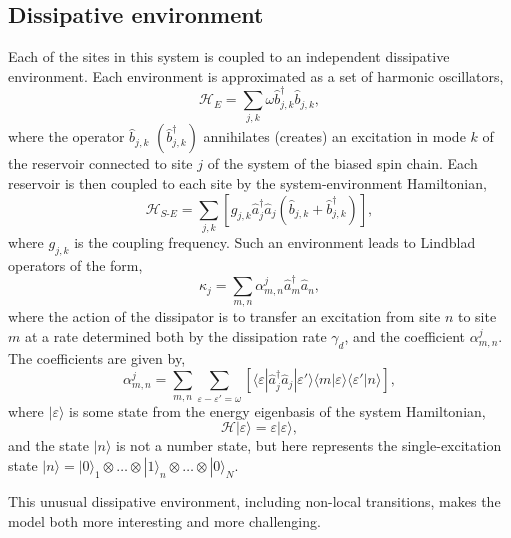 \subsection{Dissipative environment}
Each of the sites in this system is coupled to an independent dissipative environment. Each environment is approximated as a set of harmonic oscillators,
\begin{equation}
	\mathcal{H}_{E} = \sum_{j,k} \omega\hat{b}_{j,k}^{\dagger}\hat{b}_{j,k},
	\label{eq:fw1-3}
\end{equation}
where the operator \(\hat{b}_{j,k}\) \((\hat{b}_{j,k}^{\dagger})\) annihilates (creates) an excitation in mode \(k\) of the reservoir connected to site \(j\) of the system of the biased spin chain. Each reservoir is then coupled to each site by the system-environment Hamiltonian,
\begin{equation}
	\mathcal{H}_{S\text{-}E} = \sum_{j,k} \left[ g_{j,k}\hat{a}_{j}^{\dagger}\hat{a}_{j}\left( \hat{b}_{j,k} + \hat{b}_{j,k}^{\dagger} \right)\right],
	\label{eq:fw1-4}
\end{equation}
where \(g_{j,k}\) is the coupling frequency. Such an environment leads to Lindblad operators of the form,
\begin{equation}
	\kappa_{j} = \sum_{m,n} \alpha_{m,n}^{j} \hat{a}_{m}^{\dagger}\hat{a}_{n},
	\label{eq:fw1-5}
\end{equation}
where the action of the dissipator is to transfer an excitation from site \(n\) to site \(m\) at a rate determined both by the dissipation rate \(\gamma_{d}\), and the coefficient \(\alpha_{m,n}^{j}\). The coefficients are given by,
\begin{equation}
	\alpha_{m,n}^{j} = \sum_{m,n} \sum_{\varepsilon - \varepsilon' = \omega} \left[ \langle \varepsilon | \hat{a}_{j}^{\dagger}\hat{a}_{j} | \varepsilon' \rangle \langle m |\varepsilon \rangle \langle \varepsilon' | n \rangle \right], 
	\label{eq:fw1-6}
\end{equation}
where \(|\varepsilon \rangle\) is some state from the energy eigenbasis of the system Hamiltonian,
\begin{equation}
	\mathcal{H}|\varepsilon \rangle = \varepsilon|\varepsilon\rangle,
	\label{eq:fw1-7}
\end{equation}
and the state \(|n\rangle\) is not a number state, but here represents the single-excitation state \(|n \rangle = | 0 \rangle_{1} \otimes \ldots \otimes | 1 \rangle_{n} \otimes \ldots \otimes |0 \rangle_{N}\). 

This unusual dissipative environment, including non-local transitions, makes the model both more interesting and more challenging. 

